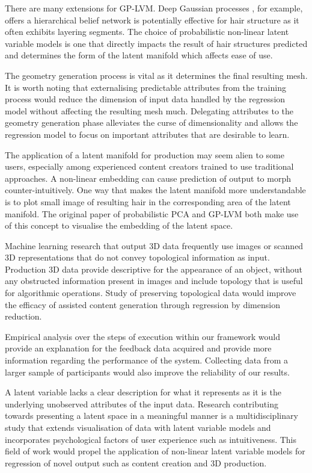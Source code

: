 \documentclass[ %
author={Dillon Keith Diep},
supervisor={Dr. Carl Henrik Ek},
degree={MEng},
title={ART-CG Hair:},
subtitle={Assisted Real-time Content Generation of Stylised Virtual Hair},
type={Research},
year={2017} ]{dissertation}
\begin{document}
There are many extensions for GP-LVM. Deep Gaussian processes \cite{deepgp}, for example, offers a hierarchical belief network is potentially effective for hair structure as it often exhibits layering segments.
The choice of probabilistic non-linear latent variable models is one that directly impacts the result of hair structures predicted and determines the form of the latent manifold which affects ease of use.

The geometry generation process is vital as it determines the final resulting mesh. It is worth noting that externalising predictable attributes from the training process would reduce the dimension of input data handled by the regression model without affecting the resulting mesh much. Delegating attributes to the geometry generation phase alleviates the curse of dimensionality and allows the regression model to focus on important attributes that are desirable to learn.

The application of a latent manifold for production may seem alien to some users, especially among experienced content creators trained to use traditional approaches. A non-linear embedding can cause prediction of output to morph counter-intuitively. One way that makes the latent manifold more understandable is to plot small image of resulting hair in the corresponding area of the latent manifold. The original paper of probabilistic PCA and GP-LVM both make use of this concept to visualise the embedding of the latent space.

Machine learning research that output 3D data frequently use images or scanned 3D representations that do not convey topological information as input. Production 3D data provide descriptive for the appearance of an object, without any obstructed information present in images and include topology that is useful for algorithmic operations. Study of preserving topological data would improve the efficacy of assisted content generation through regression by dimension reduction.

Empirical analysis over the steps of execution within our framework would provide an explanation for the feedback data acquired and provide more information regarding the performance of the system. Collecting data from a larger sample of participants would also improve the reliability of our results.

A latent variable lacks a clear description for what it represents as it is the underlying unobserved attributes of the input data. Research contributing towards presenting a latent space in a meaningful manner is a multidisciplinary study that extends visualisation of data with latent variable models and incorporates psychological factors of user experience such as intuitiveness. This field of work would propel the application of non-linear latent variable models for regression of novel output such as content creation and 3D production.
\end{document}
